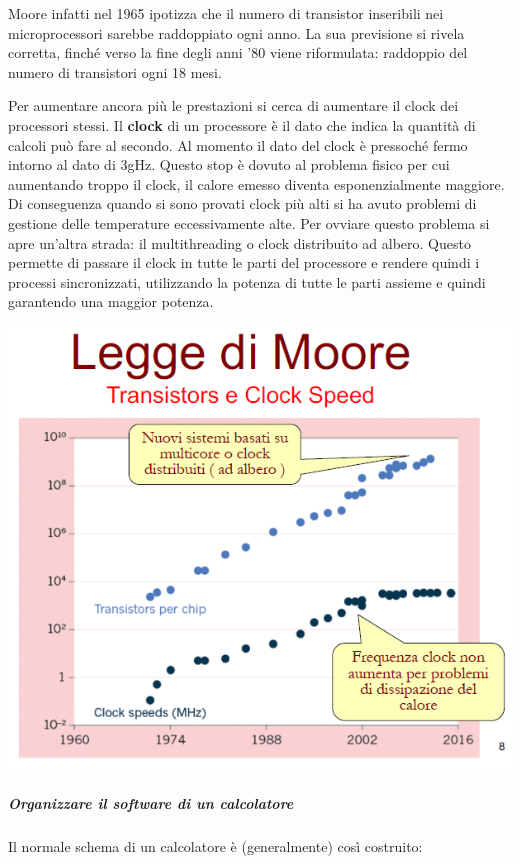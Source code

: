 \documentclass[
  paper=a4,
  oneside  ,captions=tableheading
]{scrbook}
\begin{document}
Moore infatti nel 1965 ipotizza che il numero di transistor inseribili
nei microprocessori sarebbe raddoppiato ogni anno. La sua previsione si
rivela corretta, finché verso la fine degli anni '80 viene riformulata:
raddoppio del numero di transistori ogni 18 mesi.

Per aumentare ancora più le prestazioni si cerca di aumentare il clock
dei processori stessi. Il \textbf{clock} di un processore è il dato che
indica la quantità di calcoli può fare al secondo. Al momento il dato
del clock è pressoché fermo intorno al dato di 3gHz. Questo stop è
dovuto al problema fisico per cui aumentando troppo il clock, il calore
emesso diventa esponenzialmente maggiore. Di conseguenza quando si sono
provati clock più alti si ha avuto problemi di gestione delle
temperature eccessivamente alte. Per ovviare questo problema si apre
un'altra strada: il multithreading o clock distribuito ad albero. Questo
permette di passare il clock in tutte le parti del processore e rendere
quindi i processi sincronizzati, utilizzando la potenza di tutte le
parti assieme e quindi garantendo una maggior potenza.

\includegraphics{./image/image-20201111171947392.png}

\hypertarget{organizzare-il-software-di-un-calcolatore}{%
\subparagraph{Organizzare il software di un
calcolatore}\label{organizzare-il-software-di-un-calcolatore}}

Il normale schema di un calcolatore è (generalmente) così costruito:
\end{document}
